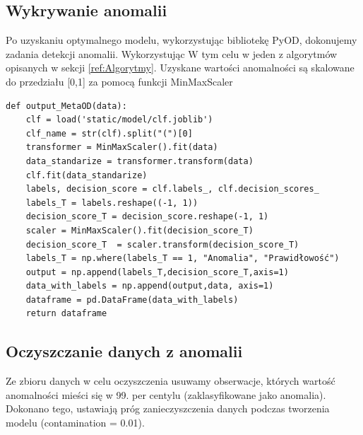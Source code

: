 \subsection{Wykrywanie anomalii}
Po uzyskaniu optymalnego modelu, wykorzystując bibliotekę PyOD, dokonujemy zadania detekcji anomalii. Wykorzystując W tym celu w jeden z algorytmów opisanych w sekcji \ref{ref:Algorytmy}. Uzyskane wartości anomalności są skalowane do przedziału [0,1] za pomocą funkcji MinMaxScaler
\lstset{language=Python}
\lstset{frame=lines}
\lstset{basicstyle=\footnotesize}
\begin{lstlisting}
def output_MetaOD(data):
    clf = load('static/model/clf.joblib')
    clf_name = str(clf).split("(")[0]
    transformer = MinMaxScaler().fit(data)
    data_standarize = transformer.transform(data)
    clf.fit(data_standarize)
    labels, decision_score = clf.labels_, clf.decision_scores_
    labels_T = labels.reshape((-1, 1))
    decision_score_T = decision_score.reshape(-1, 1)
    scaler = MinMaxScaler().fit(decision_score_T)
    decision_score_T  = scaler.transform(decision_score_T)
    labels_T = np.where(labels_T == 1, "Anomalia", "Prawidłowość")
    output = np.append(labels_T,decision_score_T,axis=1)
    data_with_labels = np.append(output,data, axis=1)
    dataframe = pd.DataFrame(data_with_labels)
    return dataframe
    \end{lstlisting}


\subsection{Oczyszczanie danych z anomalii}
Ze zbioru danych w celu oczyszczenia usuwamy obserwacje, których wartość anomalności mieści się w 99. per centylu (zaklasyfikowane jako anomalia). Dokonano tego, ustawiają próg zanieczyszczenia danych podczas tworzenia modelu (contamination = 0.01).

